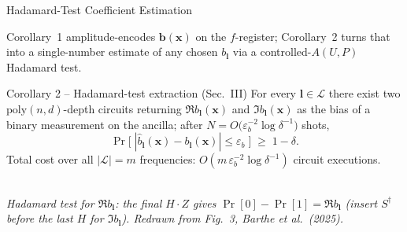 \documentclass[aspectratio=169,11pt,xcolor={dvipsnames,table}]{beamer}
\newcommand{\Lspace}{\mathcal{L}}
\renewcommand{\vec}[1]{\bm{#1}}
\newcommand{\xvec}{\vec x}
\newcommand{\bvec}{\vec b}
\theoremstyle{definition}
\begin{document}
\begin{frame}{Hadamard-Test Coefficient Estimation}

  \footnotesize
  Corollary~1 amplitude-encodes \(\bvec(\xvec)\) on the \(f\)-register;
  Corollary~2 turns that into a single-number estimate of any chosen
  \(b_{\vec l}\) via a controlled-\(A(U,P)\) Hadamard test.

  \begin{block}{\small Corollary 2 -- Hadamard-test extraction (Sec.~III)}
    \scriptsize
    For every \(\vec l\in\Lspace\) there exist two
    \(\mathrm{poly}(n,d)\)-depth circuits returning
    \(\Re b_{\vec l}(\xvec)\) and \(\Im b_{\vec l}(\xvec)\) as the
    bias of a binary measurement on the ancilla; after
    \(N=O\bigl(\varepsilon_b^{-2}\log\delta^{-1}\bigr)\) shots,
    \[
        \Pr\!\bigl[\;|\hat b_{\vec l}(\xvec)-b_{\vec l}(\xvec)|\le\varepsilon_b\;\bigr]
        \;\ge\;1-\delta.
    \]
    Total cost over all \(|\Lspace|=m\) frequencies:
    \(O(m\,\varepsilon_b^{-2}\log\delta^{-1})\) circuit executions.
  \end{block}

  \vspace{-0.2em}
  \centering
  \\[-0.1em]
  {\tiny\itshape Hadamard test for \(\Re b_{\vec l}\): the final
   \(H\!\cdot\!Z\) gives \(\Pr[0]-\Pr[1]=\Re b_{\vec l}\) (insert
   \(S^{\dagger}\) before the last \(H\) for \(\Im b_{\vec l}\)).
   \emph{Redrawn from Fig.~3, Barthe \emph{et al.}\ (2025).}}


\end{frame}
\end{document}
